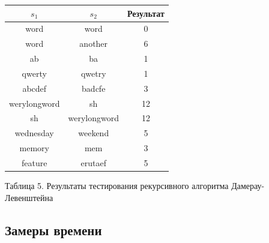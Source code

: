 \documentclass[a4paper,12pt]{article}
\begin{document}
\hfill

\begin{center}
    \begin{tabular}{|c|c|c|}
        \hline
        $s_1$ & $s_2$ & Результат \\
        \hline
        word & word & 0 \\
        \hline
        word & another & 6 \\
        \hline
        ab & ba & 1 \\
        \hline
        qwerty & qwetry & 1 \\
        \hline
        abcdef & badcfe & 3 \\
        \hline
        werylongword & sh & 12 \\
        \hline
        sh & werylongword & 12 \\
        \hline
        wednesday & weekend & 5 \\
        \hline
        memory & mem & 3 \\
        \hline
        feature & erutaef & 5 \\
        \hline
    \end{tabular}

    Таблица 5. Результаты тестирования рекурсивного алгоритма Дамерау-Левенштейна
\end{center}

\subsection{Замеры времени}
\end{document}
